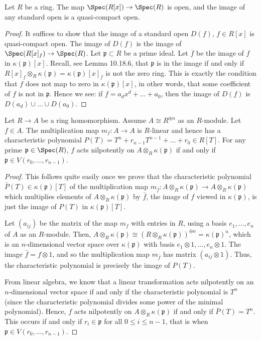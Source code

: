
\begin{lemma}[10.29.7]
Let $R$ be a ring. The map $\Spec(R[x])\to\Spec(R)$ is open, and the image of any standard open is a quasi-compact open.
\end{lemma}
\begin{proof}
It suffices to show that the image of a standard open $D(f)$, $f\in R[x]$ is quasi-compact open. The image of $D(f)$ is the image of $\Spec(R[x]_f)\to\Spec(R)$. Let $\mathfrak p\subset R$ be a prime ideal. Let $\overline f$ be the image of $f$ in $\kappa(\mathfrak p)[x]$. Recall, see Lemma 10.18.6, that $\mathfrak p$ is in the image if and only if $R[x]_f\otimes_R\kappa(\mathfrak p)=\kappa(\mathfrak p)[x]_{\overline f}$ is not the zero ring. This is exactly the condition that $f$ does not map to zero in $\kappa(\mathfrak p)[x]$, in other words, that some coefficient of $f$ is not in $\mathfrak p$. Hence we see: if $f=a_dx^d+\ldots+a_0$, then the image of $D(f)$ is $D(a_d)\cup\ldots\cup D(a_0)$.
\end{proof}
\begin{lemma}[10.29.8]
Let $R\to A$ be a ring homomorphism. Assume $A\cong R^{\oplus n}$ as an $R$-module. Let $f\in A$. The multiplication map $m_f:A\to A$ is $R$-linear and hence has a characteristic polynomial $P(T)=T^n+r_{n-1}T^{n-1}+\ldots+r_0\in R[T]$. For any prime $\mathfrak p\in\Spec(R)$, $f$ acts nilpotently on $A\otimes_R\kappa(\mathfrak p)$ if and only if $\mathfrak p\in V(r_0,\ldots,r_{n-1})$.
\end{lemma}
\begin{proof}
This follows quite easily once we prove that the characteristic polynomial $\bar P(T)\in\kappa(\mathfrak p)[T]$ of the multiplication map $m_{\bar f}:A\otimes_R\kappa(\mathfrak p)\to A\otimes_R\kappa(\mathfrak p)$ which multiplies elements of $A\otimes_R\kappa(\mathfrak p)$ by $\bar f$, the image of $f$ viewed in $\kappa(\mathfrak p)$, is just the image of $P(T)$ in $\kappa(\mathfrak p)[T]$.

Let $(a_{ij})$ be the matrix of the map $m_f$ with entries in $R$, using a basis $e_1,\ldots,e_n$ of $A$ as an $R$-module. Then, $A\otimes_R\kappa(\mathfrak p)\cong(R\otimes_R\kappa(\mathfrak p))^{\oplus n}=\kappa(\mathfrak p)^n$, which is an $n$-dimensional vector space over $\kappa(\mathfrak p)$ with basis $e_1\otimes1,\ldots,e_n\otimes1$. The image $\bar f=f\otimes1$, and so the multiplication map $m_{\bar f}$ has matrix $(a_{ij}\otimes1)$. Thus, the characteristic polynomial is precisely the image of $P(T)$.

From linear algebra, we know that a linear transformation acts nilpotently on an $n$-dimensional vector space if and only if the characteristic polynomial is $T^n$ (since the characteristic polynomial divides some power of the minimal polynomial). Hence, $f$ acts nilpotently on $A\otimes_R\kappa(\mathfrak p)$ if and only if $\bar P(T)=T^n$. This occurs if and only if $r_i\in\mathfrak p$ for all $0\leq i\leq n-1$, that is when $\mathfrak p\in V(r_0,\ldots,r_{n-1})$.
\end{proof}
